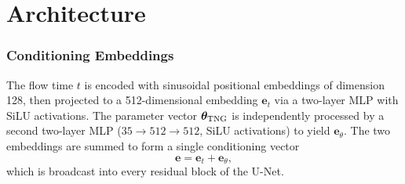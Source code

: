 \documentclass[linenumbers,trackchanges, twocolumn]{aastex701}
\begin{document}
%



\appendix

\section{Architecture}\label{appendix:architecture}
\subsubsection{Conditioning Embeddings}

The flow time $t$ is encoded with sinusoidal positional embeddings
\citep{dhariwal2021diffusion} of dimension 128, then projected to a
512-dimensional embedding $\bm{e}_t$ via a two-layer MLP with SiLU
activations. The parameter vector $\boldsymbol{\theta}_{\rm TNG}$ is
independently processed by a second two-layer MLP ($35 \to 512 \to
512$, SiLU activations) to yield $\bm{e}_\theta$. The two embeddings
are summed to form a single conditioning vector
\begin{equation}
    \bm{e} = \bm{e}_t + \bm{e}_\theta,
    \label{eq:embedding}
\end{equation}
which is broadcast into every residual block of the U-Net.
\end{document}
